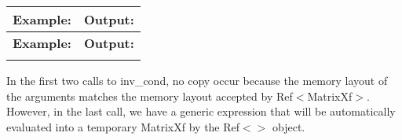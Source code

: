 \tabulinesep=1mm
\begin{longtabu} spread 0pt [c]{*{2}{|X[-1]}|}
\hline
\rowcolor{\tableheadbgcolor}\textbf{ Example\+:}&\textbf{ Output\+: }\\
\endfirsthead
\hline
\endfoot
\hline
\rowcolor{\tableheadbgcolor}\textbf{ Example\+:}&\textbf{ Output\+: }\\
\endhead

\begin{DoxyCodeInclude}
\end{DoxyCodeInclude}
  &
\begin{DoxyVerbInclude}
\end{DoxyVerbInclude}
 \\
\end{longtabu}
In the first two calls to inv\+\_\+cond, no copy occur because the memory layout of the arguments matches the memory layout accepted by Ref$<$\+Matrix\+Xf$>$. However, in the last call, we have a generic expression that will be automatically evaluated into a temporary Matrix\+Xf by the Ref$<$$>$ object.

